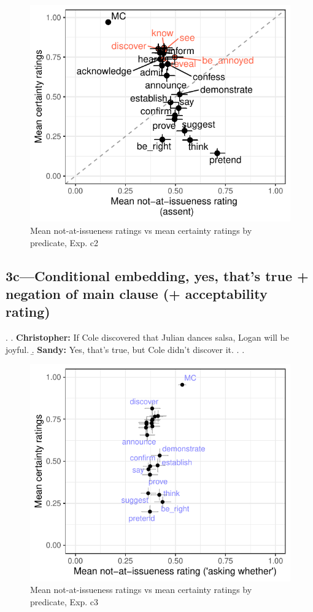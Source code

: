 \documentclass[11pt]{article}
\begin{document}
		\begin{figure}[h]
			\centering
			\includegraphics[]{figures/c2-correl.pdf}
			\caption{Mean not-at-issueness ratings vs mean certainty ratings by predicate, Exp. c2}
			\label{fig:c2-corr}
		\end{figure}


	

	\subsection{3c---Conditional embedding, yes, that's true + negation of main clause (+ acceptability rating)}
		\ex. \a. \textbf{Christopher:} If Cole discovered that Julian dances salsa, Logan will be joyful.
			\b. \textbf{Sandy:} Yes, that’s true, but Cole didn't discover it.
			\z.
		\z.
	
		\begin{figure}[h]
			\centering
			\includegraphics[]{figures/c3-correl.pdf}
			\caption{Mean not-at-issueness ratings vs mean certainty ratings by predicate, Exp. c3}
			\label{fig:c3-corr}
		\end{figure}
	
\end{document}
